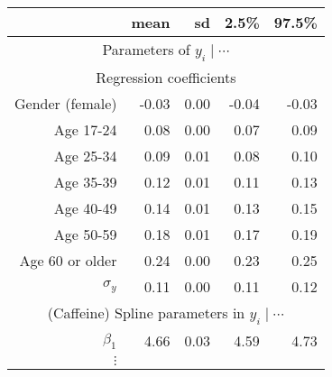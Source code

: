 \documentclass[]{imsart}
\begin{document}
\begin{table}
\begin{center}
\begin{tabular}{rrrrr}
&\textbf{mean} & \textbf{sd} & \textbf{2.5\%} & \textbf{97.5\%} \\
  \hline
  \multicolumn{5}{c}{Parameters of $y_i\mid \cdots$}\\
  \multicolumn{5}{c}{Regression coefficients}\\
Gender (female) &-0.03 & 0.00 & -0.04 & -0.03 \\%
  Age 17-24& 0.08 & 0.00 & 0.07 & 0.09 \\ %
  Age 25-34 & 0.09& 0.01 & 0.08 & 0.10 \\ %
  Age 35-39 & 0.12 & 0.01 & 0.11 & 0.13 \\ %
  Age 40-49 & 0.14 & 0.01 & 0.13 & 0.15 \\ %
  Age 50-59 & 0.18 & 0.01 & 0.17 & 0.19 \\ %
  Age 60 or older & 0.24 & 0.00 & 0.23 & 0.25 \\ %
  $\sigma_y$ & 0.11 & 0.00 & 0.11 & 0.12 \\
    \multicolumn{5}{c}{(Caffeine) Spline parameters in $y_i\mid \cdots$}\\%
$\beta_1$ & 4.66 & 0.03 & 4.59 & 4.73 \\%
$\vdots$\\

\end{tabular}
\end{center}
\end{table}
\end{document}
